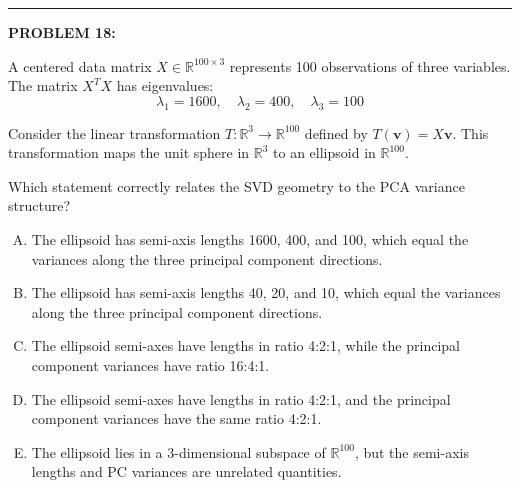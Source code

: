 \documentclass[12pt]{amsart}
\newcommand{\divider}{
  \vspace{-1em} %
  \noindent
  \raisebox{-0.15ex}{\textbullet}%
  \hspace{0.5em}%
  \rule[0.5ex]{0.95\textwidth}{1.0pt}%
  \hspace{0.5em}%
  \raisebox{-0.15ex}{\textbullet}%
  \vspace{0em} %
}
\begin{document}
\divider

\newpage



{\bf PROBLEM 18:}

A centered data matrix $X \in \mathbb{R}^{100 \times 3}$ represents 100 observations of three variables. The matrix $X^TX$ has eigenvalues:
$$\lambda_1 = 1600, \quad \lambda_2 = 400, \quad \lambda_3 = 100$$

Consider the linear transformation $T: \mathbb{R}^3 \to \mathbb{R}^{100}$ defined by $T(\mathbf{v}) = X\mathbf{v}$. This transformation maps the unit sphere in $\mathbb{R}^3$ to an ellipsoid in $\mathbb{R}^{100}$.

Which statement correctly relates the SVD geometry to the PCA variance structure?

\begin{enumerate}[(A)]
\item The ellipsoid has semi-axis lengths 1600, 400, and 100, which equal the variances along the three principal component directions.
\item The ellipsoid has semi-axis lengths 40, 20, and 10, which equal the variances along the three principal component directions.
\item The ellipsoid semi-axes have lengths in ratio 4:2:1, while the principal component variances have ratio 16:4:1.
\item The ellipsoid semi-axes have lengths in ratio 4:2:1, and the principal component variances have the same ratio 4:2:1.
\item The ellipsoid lies in a 3-dimensional subspace of $\mathbb{R}^{100}$, but the semi-axis lengths and PC variances are unrelated quantities.
\end{enumerate}
\end{document}
